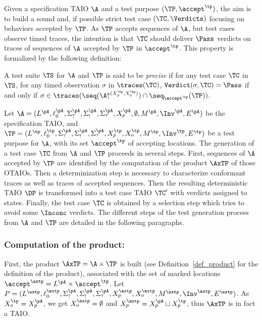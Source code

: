 \documentclass{LMCS}
\theoremstyle{plain}\newtheorem{proposition}[thm]{Proposition}
\begin{document}
Given a specification TAIO $\A$ and a test purpose $(\TP,
\accept^\tp)$, the aim is to build a sound and, if possible strict 
test case $(\TC,\Verdicts)$ focusing on behaviors accepted by $\TP$.  
As $\TP$ accepts sequences of $\A$, but  test cases observe timed traces,
the intention is that $\TC$ should deliver $\Pass$ verdicts 
on traces of sequences of $\A$ accepted by $\TP$ in $\accept^\tp$.  
This property is formalized by the following definition: 
\begin{defi}
\label{def:precise}
A test suite $\TS$ for $\A$ and $\TP$ is said to be {\em precise} 
if for any test case $\TC$ in $\TS$,
for any timed observation $\sigma$ in $\traces(\TC)$, 
${\tt Verdict}(\sigma, \TC) = \Pass$
if and only if 
$\sigma \in \traces(\seq(\A\!\!\uparrow^{(X_p^\tp,X_o^\tp)}) \cap \seq_{\accept^\tp}(\TP))$.
\end{defi}

Let $\A=(L^\pA,\ell_0^\pA,\Sigma_?^{\pA},\Sigma_!^{\pA},\Sigma_\tau
^{\pA}, X_p^\pA,\emptyset, M^\pA,\Inv^\pA,E^\pA)$ be the specification
TAIO, and $\TP=
(L^\tp,\ell_0^\tp,\Sigma_?^{\pA},\Sigma_!^{\pA},\Sigma_\tau ^{\pA},
X_p^\tp,X_o^\tp,M^\tp,\Inv^\tp,E^\tp)$ be a test purpose for $\A$,
with its set $\accept^\tp$ of accepting locations.  The generation of
a test case $\TC$ from $\A$ and $\TP$ proceeds in several steps.
First, sequences of $\A$ accepted by $\TP$ are identified by the
computation of the product $\AxTP$ of those OTAIOs.  Then a
determinization step is necessary to characterize conformant traces as
well as traces of accepted sequences.  Then the resulting
deterministic TAIO $\DP$ is transformed into a test case TAIO $\TC'$
with verdicts assigned to states.  Finally, the test case $\TC$ is
obtained by a selection step which tries to avoid some $\Inconc$
verdicts.  The different steps of the test generation process from
$\A$ and $\TP$ are detailed in the following paragraphs.


\subsubsection*{Computation of the product:} 
First, the product $\AxTP = \A \times \TP$
is built
(see Definition~\ref{def_product} for the definition of the product), 
associated with the set
of marked locations $\accept^\axtp = L^\pA \times \accept^\tp$.
Let $P= (L^\axtp,\ell_0^\axtp,\Sigma_?^{\pA},\Sigma_!^{\pA},\Sigma_\tau ^{\pA},
  X_p^\axtp,X_o^\axtp,M^\axtp,\Inv^\axtp,E^\axtp)$. 
As $X_o^\tp=X_p^\pA$, we get $X_o^\axtp= \emptyset$ and $X_p^\axtp=X_p^\pA\sqcup X_p^\tp$, thus $\AxTP$ is in fact a TAIO.
\end{document}
